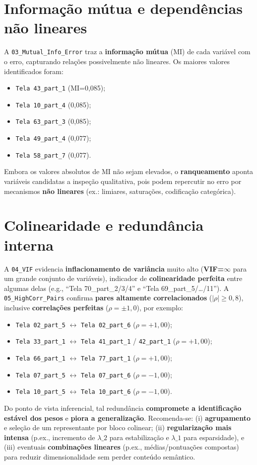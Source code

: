 \documentclass[12pt,a4paper]{article}
\begin{document}
\section{Informação mútua e dependências não lineares}
A \texttt{03\_Mutual\_Info\_Error} traz a \textbf{informação mútua} (MI) de cada variável com o erro, capturando relações possivelmente não lineares. Os maiores valores identificados foram:
\begin{itemize}[leftmargin=1.2cm]
  \item \texttt{Tela 43\_part\_1} (MI=0{,}085);
  \item \texttt{Tela 10\_part\_4} (0{,}085);
  \item \texttt{Tela 63\_part\_3} (0{,}085);
  \item \texttt{Tela 49\_part\_4} (0{,}077);
  \item \texttt{Tela 58\_part\_7} (0{,}077).
\end{itemize}
Embora os valores absolutos de MI não sejam elevados, o \textbf{ranqueamento} aponta variáveis candidatas a inspeção qualitativa, pois podem repercutir no erro por mecanismos \textbf{não lineares} (ex.: limiares, saturações, codificação categórica).

\section{Colinearidade e redundância interna}
A \texttt{04\_VIF} evidencia \textbf{inflacionamento de variância} muito alto (\textbf{VIF=$\infty$} para um grande conjunto de variáveis), indicador de \textbf{colinearidade perfeita} entre algumas delas (e.g., ``Tela 70\_part\_2/3/4'' e ``Tela 69\_part\_5/\dots/11''). A \texttt{05\_HighCorr\_Pairs} confirma \textbf{pares altamente correlacionados} ($|\rho|\ge 0{,}8$), inclusive \textbf{correlações perfeitas} ($\rho=\pm 1{,}0$), por exemplo:
\begin{itemize}[leftmargin=1.2cm]
  \item \texttt{Tela 02\_part\_5} $\leftrightarrow$ \texttt{Tela 02\_part\_6} ($\rho=+1{,}00$);
  \item \texttt{Tela 33\_part\_1} $\leftrightarrow$ \texttt{Tela 41\_part\_1} / \texttt{42\_part\_1} ($\rho=+1{,}00$);
  \item \texttt{Tela 66\_part\_1} $\leftrightarrow$ \texttt{Tela 77\_part\_1} ($\rho=+1{,}00$);
  \item \texttt{Tela 07\_part\_5} $\leftrightarrow$ \texttt{Tela 07\_part\_6} ($\rho=-1{,}00$);
  \item \texttt{Tela 10\_part\_5} $\leftrightarrow$ \texttt{Tela 10\_part\_6} ($\rho=-1{,}00$).
\end{itemize}
Do ponto de vista inferencial, tal redundância \textbf{compromete a identificação estável dos pesos} e \textbf{piora a generalização}. Recomenda-se: (i) \textbf{agrupamento} e seleção de um representante por bloco colinear; (ii) \textbf{regularização mais intensa} (p.ex., incremento de $\lambda\_2$ para estabilização e $\lambda\_1$ para esparsidade), e (iii) eventuais \textbf{combinações lineares} (p.ex., médias/pontuações compostas) para reduzir dimensionalidade sem perder conteúdo semântico.
\end{document}
